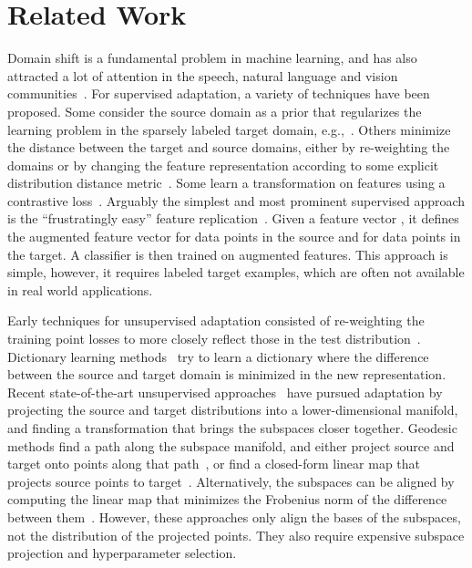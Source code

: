 \documentclass[letterpaper]{article}
\begin{document}
\section{Related Work}
\label{sec:related}

Domain shift is a fundamental problem in machine learning, and has also attracted a lot of attention in the speech, natural language and vision communities~\cite{Blitzer07Biographies,gopalan-iccv11,bmvc}.
For supervised adaptation, a variety of techniques have been proposed. Some consider the source domain as a prior that regularizes the learning problem in the sparsely labeled target domain, e.g.,~\cite{yang_icdm07}. Others minimize the distance between the target and source domains, either by re-weighting the domains or by changing the feature representation according to some explicit distribution distance metric~\cite{mmd}. Some learn a transformation on features using a contrastive loss~\cite{saenko2010adapting}. 
Arguably the simplest and most prominent supervised approach is the ``frustratingly easy'' feature replication~\cite{daume}. 
Given a feature vector , it defines the augmented feature vector  for data points in the source and  for data points in the target. A classifier is then trained on augmented features. This approach is simple, however, it requires labeled target examples, which are often not available in real world applications.

Early techniques for unsupervised adaptation consisted of re-weighting the training point losses to more closely reflect those in the test distribution~\cite{jiang-zhai07,huang_nips06}. Dictionary learning methods~\cite{dict_1,dict_2} try to learn a dictionary where the difference between the source and target domain is minimized in the new representation.
Recent state-of-the-art unsupervised approaches~\cite{gopalan-iccv11,gfk,long_cvpr,Sp_CVPR15} have pursued adaptation by projecting the source and target distributions into a lower-dimensional manifold, and finding a transformation that brings the subspaces closer together. Geodesic methods find a path along the subspace manifold, and either project source and target onto points along that path~\cite{gopalan-iccv11}, or find a closed-form linear map that projects source points to target~\cite{gfk}. Alternatively, the subspaces can be aligned by computing the linear map that minimizes the Frobenius norm of the difference between them~\cite{outlooks,sasb}. However, these approaches only align the bases of the subspaces, not the distribution of the projected points. They also require expensive subspace projection and hyperparameter selection. 
\end{document}
